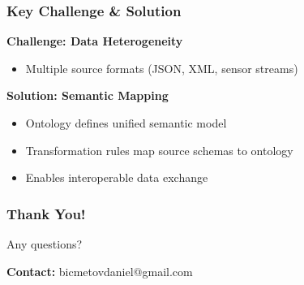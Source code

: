 \documentclass[11pt]{beamer}
\begin{document}
\begin{frame}
  \frametitle{Key Challenge \& Solution}
  
  \textbf{Challenge: Data Heterogeneity}
  \begin{itemize}
    \item Multiple source formats (JSON, XML, sensor streams)
  \end{itemize}
  
  \vspace{0.5cm}
  
  \textbf{Solution: Semantic Mapping}
  \begin{itemize}
    \item Ontology defines unified semantic model
    \item Transformation rules map source schemas to ontology
    \item Enables interoperable data exchange
  \end{itemize}
\end{frame}

\begin{frame}
  \frametitle{Thank You!}
  
  \centering
  \Large
  
  Any questions?
  
  \vspace{1cm}
  
  \normalsize
  \textbf{Contact:} bicmetovdaniel@gmail.com
\end{frame}
\end{document}
